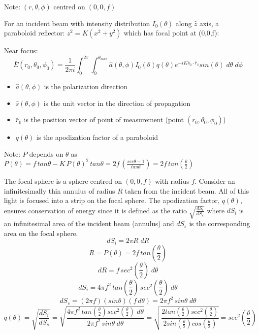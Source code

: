 \documentclass{article}
\begin{document}
    Note: \( (r,\theta , \phi) \) centred on \( (0,0,f) \)

    For an incident beam with intensity distribution \(I_0(\theta ) \) along \(\hat{z}\) axis, a paraboloid reflector: \(z^2 = K(x^2+y^2)\) which has focal point at (0,0,f):
    
    Near focus:
    \[ \bar{E}(r_0,\theta_0 ,\phi_0 ) = \frac{1}{2\pi i} \int_0^{2 \pi } \int_0^{\theta_{max}} \hat{a} (\theta , \phi) I_0(\theta) q(\theta) e^{-i K \bar{s}_0 \cdot \bar{r}_0} sin(\theta) \; {d\theta} \; {d\phi} \]
    \begin{itemize}
	\item \( \hat{a}   (\theta , \phi) \) is the polarization direction
	\item \( \hat{s} (\theta , \phi) \) is the unit vector in the direction of propagation
	\item \( \bar{r}_0 \) is the position vector of point of measurement (point \( (r_0, \theta_0 , \phi_0)\))
	\item \( q(\theta) \) is the apodization factor of a paraboloid
    \end{itemize}

    Note: \(P\) depends on \(\theta\) as \( P(\theta) = f \, tan \theta - K \, P(\theta)^2 \, tan \theta = 2f \, \left(\frac{sec \theta - 1}{tan \theta}\right) = 2f \, tan\left(\frac{\theta}{2}\right)\)

    The focal sphere is a sphere centred on \( (0,0,f) \) with radius \(f\). Consider an infinitesimally thin annulus of radius \(R\) taken from the incident beam. All of this light is focused into a strip on the focal sphere. The apodization factor, \(q(\theta)\), ensures conservation of energy since it is defined as the ratio \(\sqrt{\frac{dS_i}{dS_s}}\) where \(dS_i\) is an infinitesimal area of the incident beam (annulus) and \(dS_s\) is the corresponding area on the focal sphere.
    \[dS_i = 2 \pi R \; dR\]
    \[ R = P(\theta) = 2f \, tan\left(\frac{\theta}{2}\right)\]
    \[ dR = f \, sec^2\left(\frac{\theta}{2}\right) \; d\theta \]
    \[ dS_i = 4 \pi f^2 \, tan\left(\frac{\theta}{2}\right) \, sec^2\left(\frac{\theta}{2}\right) \; d\theta \]
    \[ dS_s = (2 \pi f) (sin \theta) (f \, d\theta) = 2 \pi f^2 \, sin \theta  \; d\theta \]
    \[ q(\theta) = \sqrt{\frac{dS_i}{dS_s}} = \sqrt{\frac{4 \pi f^2 \, tan\left(\frac{\theta}{2}\right) sec^2\left(\frac{\theta}{2}\right) \; d\theta}{2 \pi f^2 \, sin \theta \; d\theta}} = \sqrt{\frac{2 tan\left(\frac{\theta}{2}\right) sec^2\left(\frac{\theta}{2}\right) }{2 sin\left(\frac{\theta}{2}\right) cos\left(\frac{\theta}{2}\right)}} = sec^2\left(\frac{\theta}{2}\right) \]
\end{document}
